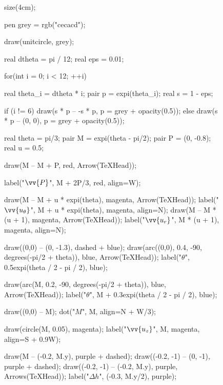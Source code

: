 \documentclass[a4paper]{report}
\let\vec\vv
\begin{document}
	\begin{wrapfigure}{l}{5cm}
		\centering
		\begin{asy}
			size(4cm);

			pen grey = rgb("cecacd");

			draw(unitcircle, grey);

			real dtheta = pi / 12;
			real eps = 0.01;

			for(int i = 0; i < 12; ++i) {
				real theta_i = dtheta * i;
				pair p = expi(theta_i);
				real s = 1 - eps;

				if (i != 6)
					draw(s * p -- -s * p, p = grey + opacity(0.5));
				else
					draw(s * p -- (0, 0), p = grey + opacity(0.5));
			}

			real theta = pi/3;
			pair M = expi(theta - pi/2);
			pair P = (0, -0.8);
			real u = 0.5;

			draw(M -- M + P, red, Arrow(TeXHead));

			label("$\vec{P}$", M + 2P/3, red, align=W);

			draw(M -- M + u * expi(theta), magenta, Arrow(TeXHead));
			label("\small$\vec{u_\theta}$", M + u * expi(theta), magenta, align=N);
			draw(M -- M * (u + 1), magenta, Arrow(TeXHead));
			label("\small$\vec{u_r}$", M * (u + 1), magenta, align=N);

			draw((0,0) -- (0, -1.3), dashed + blue);
			draw(arc((0,0), 0.4, -90, degrees(-pi/2 + theta)), blue, Arrow(TeXHead));
			label("$\theta$", 0.5expi(theta / 2 - pi / 2), blue);

			draw(arc(M, 0.2, -90, degrees(-pi/2 + theta)), blue, Arrow(TeXHead));
			label("\small$\theta$", M + 0.3expi(theta / 2 - pi / 2), blue);

			draw((0,0) -- M);
			dot("$M$", M, align=N + W/3);

			draw(circle(M, 0.05), magenta);
			label("\small$\vec{u_z}$", M, magenta, align=S + 0.9W);

			draw(M -- (-0.2, M.y), purple + dashed);
			draw((-0.2, -1) -- (0, -1), purple + dashed);
			draw((-0.2, -1) -- (-0.2, M.y), purple, Arrows(TeXHead));
			label("$\Delta h$", (-0.3, M.y/2), purple);
		\end{asy}
	\end{wrapfigure}
\end{document}
